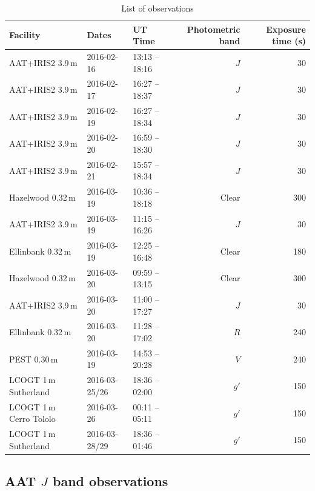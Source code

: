 \documentclass[iop,useAMES,usenatbig]{emulateapj}
\begin{document}
\begin{table}
\centering
\caption{\label{tab:observations}List of observations}
\begin{tabular}{lllrr}
\hline\hline
Facility & Dates & UT Time & Photometric band & Exposure time (s) \\
\hline
AAT+IRIS2 3.9\,m & 2016-02-16 & 13:13 -- 18:16 & $J$ & 30 \\
AAT+IRIS2 3.9\,m & 2016-02-17 & 16:27 -- 18:37 & $J$ & 30 \\
AAT+IRIS2 3.9\,m & 2016-02-19 & 16:27 -- 18:34 & $J$ & 30 \\
AAT+IRIS2 3.9\,m & 2016-02-20 & 16:59 -- 18:30 & $J$ & 30 \\
AAT+IRIS2 3.9\,m & 2016-02-21 & 15:57 -- 18:34 & $J$ & 30 \\
Hazelwood 0.32\,m & 2016-03-19 & 10:36 -- 18:18 & Clear & 300 \\
AAT+IRIS2 3.9\,m & 2016-03-19 & 11:15 -- 16:26 & $J$ & 30 \\
Ellinbank 0.32\,m & 2016-03-19 & 12:25 -- 16:48 & Clear & 180 \\
Hazelwood 0.32\,m & 2016-03-20 & 09:59 -- 13:15 & Clear & 300 \\
AAT+IRIS2 3.9\,m & 2016-03-20 & 11:00 -- 17:27 & $J$ & 30 \\
Ellinbank 0.32\,m & 2016-03-20 & 11:28 -- 17:02 & $R$ & 240 \\
PEST 0.30\,m & 2016-03-19 & 14:53 -- 20:28 & $V$ & 240 \\
LCOGT 1\,m Sutherland & 2016-03-25/26 & 18:36 -- 02:00 & $g'$ & 150 \\
LCOGT 1\,m Cerro Tololo & 2016-03-26 & 00:11 -- 05:11 & $g'$ & 150 \\
LCOGT 1\,m Sutherland & 2016-03-28/29 & 18:36 -- 01:46 & $g'$ & 150 \\
\hline
\end{tabular}
\end{table}

\subsection{AAT $J$ band observations}
\label{sec:obs_aat}
\end{document}
